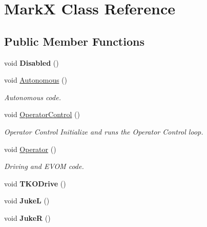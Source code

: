 \hypertarget{classMarkX}{\section{\-Mark\-X \-Class \-Reference}
\label{classMarkX}
}
\subsection*{\-Public \-Member \-Functions}
\begin{DoxyCompactItemize}
\item 
\hypertarget{classMarkX_a41d9adbc4fa71a9ee08ce212564bbbf3}{void {\bfseries \-Disabled} ()}\label{classMarkX_a41d9adbc4fa71a9ee08ce212564bbbf3}

\item 
\hypertarget{classMarkX_a2eb4b8bbbd0c77f13ec8e1e146697202}{void \hyperlink{classMarkX_a2eb4b8bbbd0c77f13ec8e1e146697202}{\-Autonomous} ()}\label{classMarkX_a2eb4b8bbbd0c77f13ec8e1e146697202}

\begin{DoxyCompactList}\small\item\em \-Autonomous code. \end{DoxyCompactList}\item 
void \hyperlink{classMarkX_a805d243d52b14400654fb7729ada64ee}{\-Operator\-Control} ()
\begin{DoxyCompactList}\small\item\em \-Operator \-Control \-Initialize and runs the \-Operator \-Control loop. \end{DoxyCompactList}\item 
\hypertarget{classMarkX_a45e7bc7a9bad1fa9bdc46b3382b6740e}{void \hyperlink{classMarkX_a45e7bc7a9bad1fa9bdc46b3382b6740e}{\-Operator} ()}\label{classMarkX_a45e7bc7a9bad1fa9bdc46b3382b6740e}

\begin{DoxyCompactList}\small\item\em \-Driving and \-E\-V\-O\-M code. \end{DoxyCompactList}\item 
\hypertarget{classMarkX_a9aacece1681d7b08a1832cb7e3b7691a}{void {\bfseries \-T\-K\-O\-Drive} ()}\label{classMarkX_a9aacece1681d7b08a1832cb7e3b7691a}

\item 
\hypertarget{classMarkX_ad5d6b5f044465562a220ce404e35f6ba}{void {\bfseries \-Juke\-L} ()}\label{classMarkX_ad5d6b5f044465562a220ce404e35f6ba}

\item 
\hypertarget{classMarkX_a2eed152d21cfb3ed949f15087c28b604}{void {\bfseries \-Juke\-R} ()}\label{classMarkX_a2eed152d21cfb3ed949f15087c28b604}


\end{DoxyCompactItemize}
